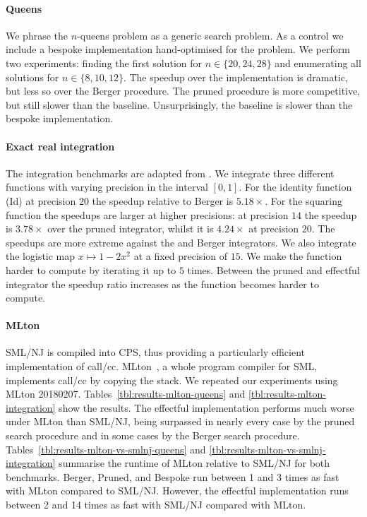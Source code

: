 \documentclass[12pt,phd,lfcs,twoside,openright,logo,leftchapter,normalheadings]{infthesis}
\theoremstyle{plain}
\theoremstyle{definition}
\begin{document}
\paragraph{Queens}
We phrase the $n$-queens problem as a generic search problem. As a
control we include a bespoke implementation hand-optimised for the
problem. We perform two experiments: finding the first solution for $n
\in \{20,24,28\}$ and enumerating all solutions for $n \in
\{8,10,12\}$. The speedup over the \naive implementation is dramatic,
but less so over the Berger procedure. The pruned procedure is more
competitive, but still slower than the baseline. Unsurprisingly, the
baseline is slower than the bespoke implementation.

\paragraph{Exact real integration}
The integration benchmarks are adapted from \citet{Simpson98}. We
integrate three different functions with varying precision in the
interval $[0,1]$. For the identity function (Id) at precision $20$ the
speedup relative to Berger is $5.18\times$. For the squaring function
the speedups are larger at higher precisions: at precision $14$ the
speedup is $3.78\times$ over the pruned integrator, whilst it is
$4.24\times$ at precision $20$. The speedups are more extreme against
the \naive and Berger integrators. We also integrate the logistic map
$x \mapsto 1 - 2x^2$ at a fixed precision of $15$. We make the
function harder to compute by iterating it up to $5$ times. Between
the pruned and effectful integrator the speedup ratio increases as the
function becomes harder to compute.

\paragraph{MLton}
SML/NJ is compiled into CPS, thus providing a particularly efficient
implementation of call/cc.
%
MLton~\cite{Fluet20}, a whole program compiler for SML, implements
call/cc by copying the stack.
%
We repeated our experiments using MLton 20180207.
%
Tables~\ref{tbl:results-mlton-queens} and
\ref{tbl:results-mlton-integration} show the results. The effectful
implementation performs much worse under MLton than SML/NJ, being
surpassed in nearly every case by the pruned search procedure and in
some cases by the Berger search procedure.
%
Tables~\ref{tbl:results-mlton-vs-smlnj-queens} and
\ref{tbl:results-mlton-vs-smlnj-integration} summarise the runtime of
MLton relative to SML/NJ for both benchmarks. Berger, Pruned, and
Bespoke run between 1 and 3 times as fast with MLton compared to
SML/NJ.
%
However, the effectful implementation runs between 2 and 14 times as
fast with SML/NJ compared with MLton.
\end{document}
